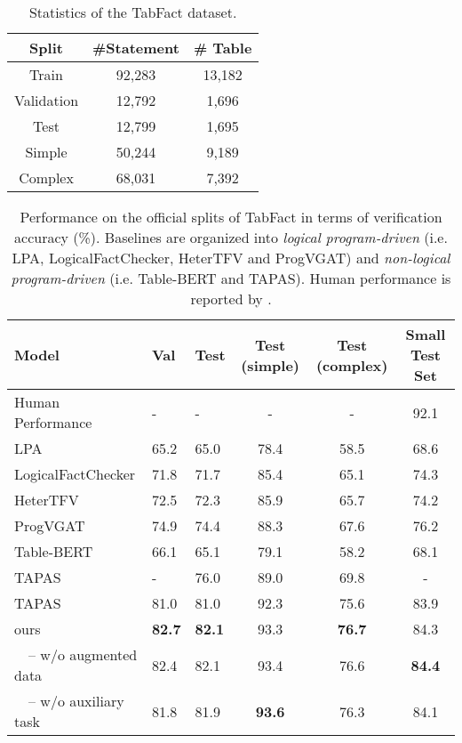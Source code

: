 \documentclass[11pt]{article}
\begin{document}
\begin{table}[t]
\centering
\small
\begin{tabular}{ccc}
\toprule Split & \#Statement & \# Table  \\ \midrule
Train & 92,283 & 13,182 \\
Validation & 12,792 & 1,696 \\
Test & 12,799 & 1,695 \\ \midrule
Simple & 50,244 & 9,189 \\
Complex & 68,031 & 7,392 \\
\bottomrule \end{tabular}
\caption{Statistics of the TabFact dataset.}
\label{table:dataset}
\end{table} 


\begin{table*}[t]
\centering
{
\small
\begin{tabular}{l|p{1.5cm}<{\centering} p{1.5cm}<{\centering} ccc}
\toprule
Model & Val & Test & Test (simple) & Test (complex) & Small Test Set \\ 
\midrule
Human Performance & - & - & - & - & 92.1 \\
\midrule
LPA & 65.2 & 65.0 & 78.4 & 58.5 & 68.6 \\
LogicalFactChecker &71.8& 71.7& 85.4& 65.1& 74.3\\
HeterTFV & 72.5 & 72.3 & 85.9 & 65.7 & 74.2 \\
ProgVGAT& 74.9 & 74.4& 88.3& 67.6& 76.2\\ \midrule
Table-BERT &66.1&65.1&79.1&58.2&68.1 \\
TAPAS \cite{dong2021structural} & - & 76.0 & 89.0 & 69.8 & - \\
TAPAS \cite{eisenschlos2020understanding} &81.0 &81.0& 92.3& 75.6& 83.9 \\
\midrule
ours & \textbf{82.7} & \textbf{82.1} & 93.3 & \textbf{76.7} & 84.3 \\
\ \ -- w/o augmented data & 82.4 & 82.1 & 93.4 & 76.6 & \textbf{84.4} \\
\ \ -- w/o auxiliary task & 81.8 & 81.9 & \textbf{93.6} & 76.3 & 84.1 \\
\bottomrule
\end{tabular}
}
\caption{Performance on the official splits of TabFact in terms of verification accuracy (\%).
Baselines are organized into \textit{logical program-driven} (i.e. LPA, LogicalFactChecker, HeterTFV and ProgVGAT) and \textit{non-logical program-driven} (i.e. Table-BERT and TAPAS). Human performance is reported by \citet{chen2019tabfact}.
}
\label{table:result}
\end{table*} 
\end{document}
